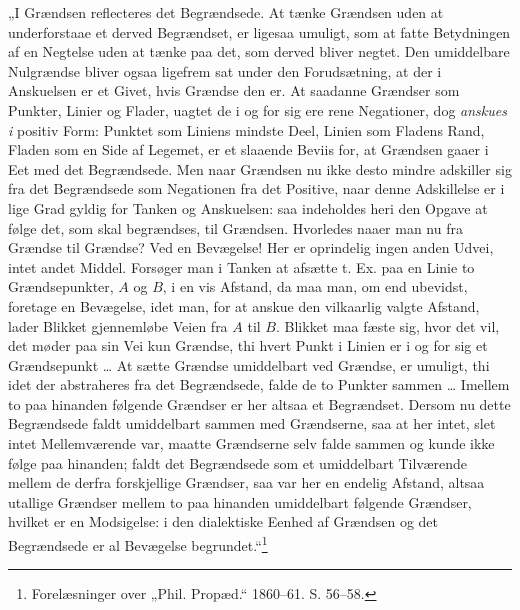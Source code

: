 \documentclass[11pt]{book}
\newcommand{\opage}[1]{\marginnote{\footnotesize\textit{[#1]}}}
\begin{document}
„I Grændsen reflecteres det Begrændsede. At tænke Grændsen uden at
underforstaae et derved Begrændset, er ligesaa umuligt, som at fatte
Betydningen af en Negtelse uden at tænke paa det, som derved bliver
negtet. Den umiddelbare Nulgrændse bliver ogsaa ligefrem sat under
den Forudsætning, at der i Anskuelsen er et Givet, hvis Grændse den
er. At saadanne Grændser som Punkter, Linier og Flader, uagtet de i
og for sig ere rene Negationer, dog \emph{anskues i} positiv Form:
Punktet som Liniens mindste Deel, Linien som Fladens Rand, Fladen som
en Side af Legemet, er et slaaende Beviis for, at Grændsen gaaer i
Eet med det Begrændsede. Men naar Grændsen nu ikke desto mindre
adskiller sig fra det Begrændsede som Negationen fra det Positive,
naar denne Adskillelse er i lige Grad gyldig for Tanken og
Anskuelsen: saa indeholdes heri den Opgave at følge det, som skal
begrændses, til Grændsen. Hvorledes naaer man nu fra Grændse til
Grændse? Ved en Bevægelse! Her er
\opage{22} \setcounter{footnote}{0}%
oprindelig ingen anden Udvei, intet andet Middel. Forsøger man i
Tanken at afsætte t. Ex. paa en Linie to Grændsepunkter, $A$ og $B$,
i en vis Afstand, da maa man, om end ubevidst, foretage en Bevægelse,
idet man, for at anskue den vilkaarlig valgte Afstand, lader Blikket
gjennemløbe Veien fra $A$ til $B$. Blikket maa fæste sig, hvor det
vil, det møder paa sin Vei kun Grændse, thi hvert Punkt i Linien er i
og for sig et Grændsepunkt \dots{} At sætte Grændse umiddelbart ved
Grændse, er umuligt, thi idet der abstraheres fra det Begrændsede,
falde de to Punkter sammen \dots{} Imellem to paa hinanden følgende
Grændser er her altsaa et Begrændset. Dersom nu dette Begrændsede
faldt umiddelbart sammen med Grændserne, saa at her intet, slet intet
Mellemværende var, maatte Grændserne selv falde sammen og kunde ikke
følge paa hinanden; faldt det Begrændsede som et umiddelbart
Tilværende mellem de derfra forskjellige Grændser, saa var her en
endelig Afstand, altsaa utallige Grændser mellem to paa hinanden
umiddelbart følgende Grændser, hvilket er en Modsigelse: i den
dialektiske Eenhed af Grændsen og det Begrændsede er al Bevægelse
begrundet.“\footnote{Forelæsninger over „Phil. Propæd.“ 1860--61.
S. 56--58.}
\end{document}
